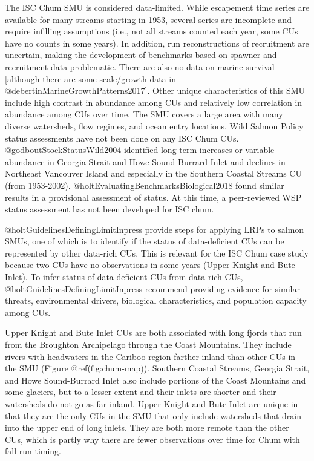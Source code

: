 \documentclass[
]{article}
\begin{document}
The ISC Chum SMU is considered data-limited. While escapement time
series are available for many streams starting in 1953, several series
are incomplete and require infilling assumptions (i.e., not all streams
counted each year, some CUs have no counts in some years). In addition,
run reconstructions of recruitment are uncertain, making the development
of benchmarks based on spawner and recruitment data problematic. There
are also no data on marine survival {[}although there are some
scale/growth data in @debertinMarineGrowthPatterns2017{]}. Other unique
characteristics of this SMU include high contrast in abundance among CUs
and relatively low correlation in abundance among CUs over time. The SMU
covers a large area with many diverse watersheds, flow regimes, and
ocean entry locations. Wild Salmon Policy status assessments have not
been done on any ISC Chum CUs. @godboutStockStatusWild2004 identified
long-term increases or variable abundance in Georgia Strait and Howe
Sound-Burrard Inlet and declines in Northeast Vancouver Island and
especially in the Southern Coastal Streams CU (from 1953-2002).
@holtEvaluatingBenchmarksBiological2018 found similar results in a
provisional assessment of status. At this time, a peer-reviewed WSP
status assessment has not been developed for ISC chum.

@holtGuidelinesDefiningLimitInpress provide steps for applying LRPs to
salmon SMUs, one of which is to identify if the status of data-deficient
CUs can be represented by other data-rich CUs. This is relevant for the
ISC Chum case study because two CUs have no observations in some years
(Upper Knight and Bute Inlet). To infer status of data-deficient CUs
from data-rich CUs, @holtGuidelinesDefiningLimitInpress recommend
providing evidence for similar threats, environmental drivers,
biological characteristics, and population capacity among CUs.

Upper Knight and Bute Inlet CUs are both associated with long fjords
that run from the Broughton Archipelago through the Coast Mountains.
They include rivers with headwaters in the Cariboo region farther inland
than other CUs in the SMU (Figure @ref(fig:chum-map)). Southern Coastal
Streams, Georgia Strait, and Howe Sound-Burrard Inlet also include
portions of the Coast Mountains and some glaciers, but to a lesser
extent and their inlets are shorter and their watersheds do not go as
far inland. Upper Knight and Bute Inlet are unique in that they are the
only CUs in the SMU that only include watersheds that drain into the
upper end of long inlets. They are both more remote than the other CUs,
which is partly why there are fewer observations over time for Chum with
fall run timing.
\end{document}
